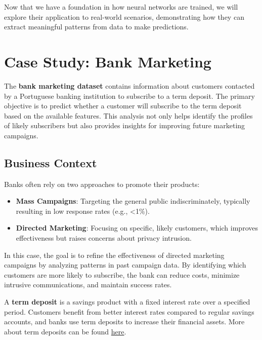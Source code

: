 \documentclass[
]{book}
\providecommand{\tightlist}{%
  \setlength{\itemsep}{0pt}\setlength{\parskip}{0pt}}
\theoremstyle{definition}
\theoremstyle{definition}
\theoremstyle{definition}
\theoremstyle{definition}
\theoremstyle{remark}
\begin{document}
Now that we have a foundation in how neural networks are trained, we will explore their application to real-world scenarios, demonstrating how they can extract meaningful patterns from data to make predictions.

\section{Case Study: Bank Marketing}\label{case-study-bank-marketing}

The \textbf{bank marketing dataset} contains information about customers contacted by a Portuguese banking institution to subscribe to a term deposit. The primary objective is to predict whether a customer will subscribe to the term deposit based on the available features. This analysis not only helps identify the profiles of likely subscribers but also provides insights for improving future marketing campaigns.

\subsection*{Business Context}\label{business-context}

Banks often rely on two approaches to promote their products:

\begin{itemize}
\tightlist
\item
  \textbf{Mass Campaigns}: Targeting the general public indiscriminately, typically resulting in low response rates (e.g., \textless1\%).\\
\item
  \textbf{Directed Marketing}: Focusing on specific, likely customers, which improves effectiveness but raises concerns about privacy intrusion.
\end{itemize}

In this case, the goal is to refine the effectiveness of directed marketing campaigns by analyzing patterns in past campaign data. By identifying which customers are more likely to subscribe, the bank can reduce costs, minimize intrusive communications, and maintain success rates.

A \textbf{term deposit} is a savings product with a fixed interest rate over a specified period. Customers benefit from better interest rates compared to regular savings accounts, and banks use term deposits to increase their financial assets. More about term deposits can be found \href{https://www.investopedia.com/terms/t/termdeposit.asp}{here}.
\end{document}
